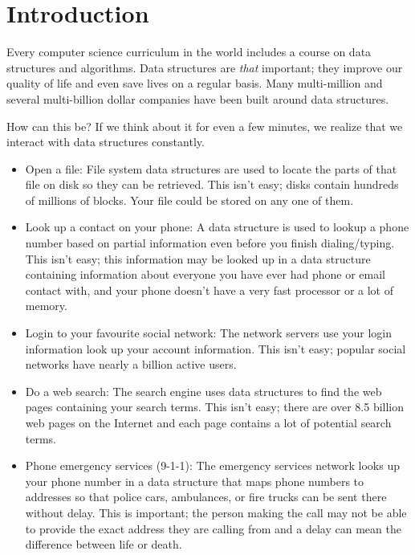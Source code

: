 \chapter{Introduction}

Every computer science curriculum in the world includes a course on data
structures and algorithms.  Data structures are \emph{that} important;
they improve our quality of life and even save lives on a regular basis.
Many multi-million and several multi-billion dollar companies have been
built around data structures.

How can this be?  If we think about it for even a few minutes, we
realize that we interact with data structures constantly.
\begin{itemize}
  \item  Open a file: File system data structures are used to locate
    the parts of that file on disk so they can be retrieved.  This isn't
    easy; disks contain hundreds of millions of blocks.  Your file could
    be stored on any one of them.
  \item Look up a contact on your phone:  A data
    structure is used to lookup a phone number based on partial
    information even before you finish dialing/typing.  This isn't easy;
    this information may be looked up in a data structure containing
    information about everyone you have ever had phone or email contact
    with, and your phone doesn't have a very fast processor or a lot
    of memory.
  \item Login to your favourite social network:  The network servers
    use your login information look up your account information.
    This isn't easy; popular social networks have nearly a billion
    active users.
  \item Do a web search: The search engine uses data structures to find
    the web pages containing your search terms.  This isn't easy; there
    are over 8.5 billion web pages on the Internet and each page contains
    a lot of potential search terms.
  \item Phone emergency services (9-1-1):  The emergency services network
    looks up your phone number in a data structure that maps phone numbers
    to addresses so that police cars, ambulances, or fire trucks can be
    sent there without delay. This is important;  the person making the
    call may not be able to provide the exact address they are calling
    from and a delay can mean the difference between life or death.
\end{itemize}

